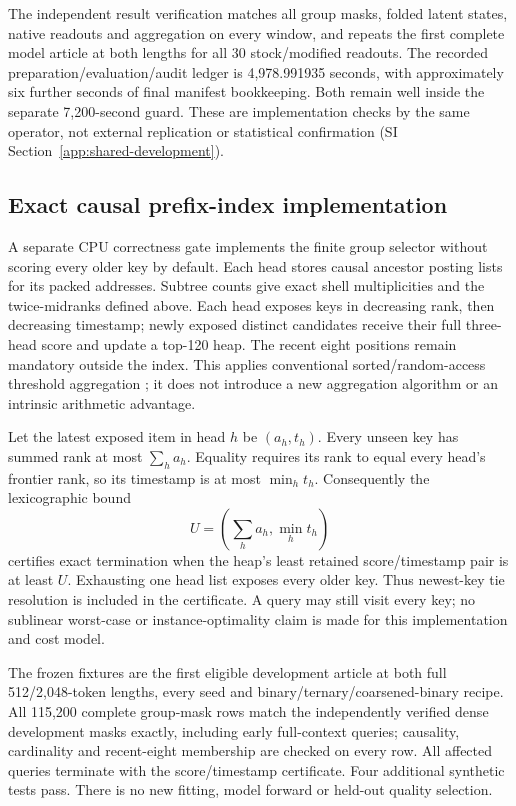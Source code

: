 \documentclass[11pt]{article}
\begin{document}
The independent result verification matches all group masks, folded latent
states, native readouts and aggregation on every window, and repeats the first
complete model article at both lengths for all 30 stock/modified readouts.
The recorded preparation/evaluation/audit ledger is 4,978.991935 seconds,
with approximately six further seconds of final manifest bookkeeping.
Both remain well inside the separate 7,200-second guard. These are implementation checks by
the same operator, not external replication or statistical confirmation
(SI Section~\ref{app:shared-development}).

\subsection{Exact causal prefix-index implementation}
\label{sec:causal-index}

A separate CPU correctness gate implements the finite group selector without
scoring every older key by default. Each head stores causal ancestor posting
lists for its packed addresses. Subtree counts give exact shell multiplicities
and the twice-midranks defined above. Each head exposes keys in decreasing
rank, then decreasing timestamp; newly exposed distinct candidates receive
their full three-head score and update a top-120 heap. The recent eight
positions remain mandatory outside the index. This applies conventional
sorted/random-access threshold aggregation \citep{fagin2003aggregation}; it
does not introduce a new aggregation algorithm or an intrinsic arithmetic
advantage.

Let the latest exposed item in head \(h\) be \((a_h,t_h)\). Every unseen key
has summed rank at most \(\sum_h a_h\). Equality requires its rank to equal
every head's frontier rank, so its timestamp is at most \(\min_h t_h\).
Consequently the lexicographic bound
\[
 U=\left(\sum_h a_h,\min_h t_h\right)
\]
certifies exact termination when the heap's least retained score/timestamp
pair is at least \(U\). Exhausting one head list exposes every older key.
Thus newest-key tie resolution is included in the certificate. A query may
still visit every key; no sublinear worst-case or instance-optimality claim is
made for this implementation and cost model.

The frozen fixtures are the first eligible development article at both full
512/2,048-token lengths, every seed and binary/ternary/coarsened-binary
recipe. All 115,200 complete group-mask rows match the independently verified
dense development masks exactly, including early full-context queries;
causality, cardinality and recent-eight membership are checked on every row.
All affected queries terminate with the score/timestamp certificate. Four
additional synthetic tests pass. There is no new fitting, model forward or
held-out quality selection.
\end{document}
